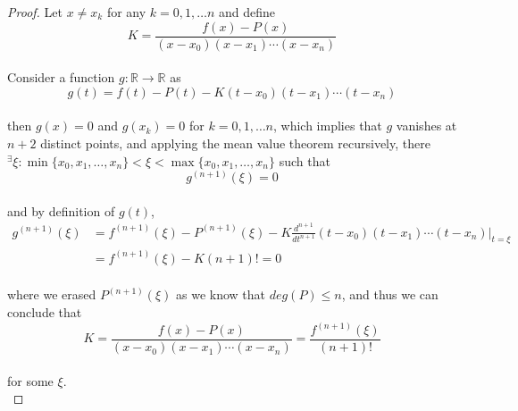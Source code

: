 \documentclass[paper=a4, fontsize=11pt]{scrartcl}
\begin{document}
\begin{proof}
	Let $x \neq x_k$ for any $k=0,1,\dots n$ and define \\
	
	\begin{equation}\nonumber
		K = \frac{f(x)-P(x)}{(x-x_0)(x-x_1) \cdots (x-x_n)}
	\end{equation}\\
	
	Consider a function $g:\mathbb{R} \to \mathbb{R}$ as \\
	
	\begin{equation}\nonumber
		g(t) = f(t) - P(t) - K (t-x_0)(t-x_1) \cdots (t-x_n)
	\end{equation}\\
	
	then $g(x)=0$ and $g(x_k)=0$ for $k=0,1, \dots n$, which implies that $g$ vanishes at $n+2$ distinct points, and applying the mean value theorem recursively, there $^\exists \xi : \min\{x_0, x_1, \dots , x_n\} < \xi < \max\{ x_0, x_1, \dots , x_n \}$ such that \\
	
	\begin{equation}\nonumber
		g^{(n+1)}(\xi) = 0
	\end{equation}\\
	
	and by definition of $g(t)$,\\
	
	\begin{equation}\nonumber
	\begin{split}
		g^{(n+1)}(\xi) &= f^{(n+1)}(\xi) - P^{(n+1)}(\xi) - K \frac{d^{n+1}}{dt^{n+1}}(t-x_0)(t-x_1) \cdots (t-x_n) \Big|_{t = \xi} \\[2.5ex]
		&= f^{(n+1)}(\xi) - K (n+1)! =0
	\end{split}
	\end{equation}\\
	
	where we erased $P^{(n+1)}(\xi)$ as we know that $deg(P) \leq n$, and thus we can conclude that\\
	
	\begin{equation}\nonumber
	K = \frac{f(x)-P(x)}{(x-x_0)(x-x_1) \cdots (x-x_n)} = \frac{f^{(n+1)}(\xi) }{(n+1)!}
	\end{equation}\\
	
	for some $\xi$.\\
\end{proof}
\end{document}
